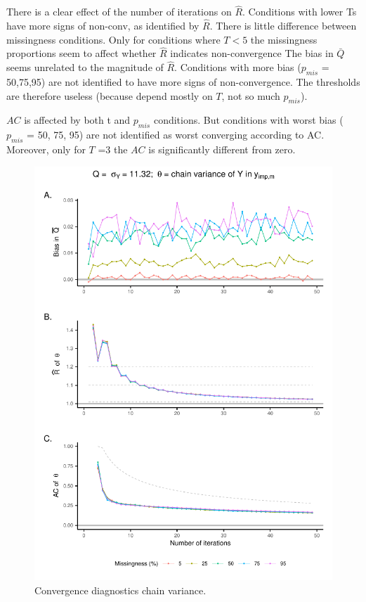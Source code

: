 \documentclass[Royal,times,sageh]{sagej}
\begin{document}
There is a clear effect of the number of iterations on \(\widehat{R}\). Conditions with lower Ts have more signs of non-conv, as identified by \(\widehat{R}\). There is little difference between missingness conditions. Only for conditions where \(T<5\) the missingness proportions seem to affect whether \(\widehat{R}\) indicates non-convergence The bias in \(\bar{Q}\) seems unrelated to the magnitude of \(\widehat{R}\). Conditions with more bias (\(p_{mis}\) = 50,75,95) are not identified to have more signs of non-convergence. The thresholds are therefore useless (because depend mostly on \(T\), not so much \(p_{mis}\)).

\(AC\) is affected by both t and \(p_{mis}\) conditions. But conditions with worst bias (\(p_{mis}\) = 50, 75, 95) are not identified as worst converging according to AC. Moreover, only for \(T\) =3 the \(AC\) is significantly different from zero.

\begin{figure}

{\centering \includegraphics{manuscript_files/figure-latex/sd-1} 

}

\caption{Convergence diagnostics chain variance.}\label{fig:sd}
\end{figure}
\end{document}
